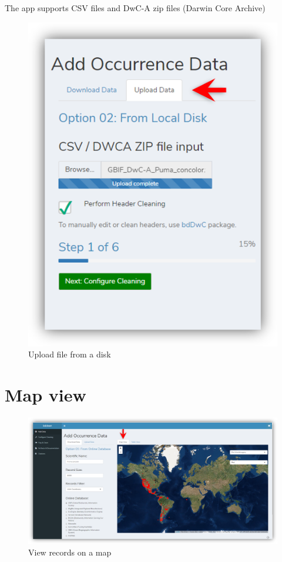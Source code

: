 \documentclass[]{book}
\begin{document}
The app supports CSV files and DwC-A zip files (Darwin Core Archive)

\begin{figure}
\centering
\includegraphics{img/bdclean_upload_data.png}
\caption{Upload file from a disk}
\end{figure}

\section{Map view}\label{map-view}

\begin{figure}
\centering
\includegraphics{img/bdclean_add_data_map.png}
\caption{View records on a map}
\end{figure}
\end{document}
